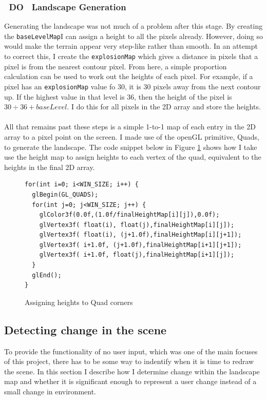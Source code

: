 \documentclass[11pt]{article}
\begin{document}
\subsubsection{~DO~ Landscape Generation}
Generating the landscape was not much of a problem after this stage. By
creating the \texttt{baseLevelMap}I can assign a height to all the pixels
already. However, doing so would make the terrain appear very step-like
rather than smooth. In an attempt to correct this, I create the 
\texttt{explosionMap} which gives a distance in pixels that a pixel 
is from the nearest contour pixel. From here, a simple proportion 
calculation can be used to work out the heights of each pixel. For 
example, if a pixel has an \texttt{explosionMap} value fo 30, it is 30 
pixels away from the next contour up. If the highest value in that
level is 36, then the height of the pixel is
$30 \div 36 + baseLevel$. I do this for all pixels in the 2D array
and store the heights.\\
\\  
All that remains past these steps is a simple 1-to-1 map of each
entry in the 2D array to a pixel point on the screen. I made use of
the openGL primitive, Quads, to generate the landscape. The code snippet
below in Figure \ref{quadcode} shows how I take use the height map 
to assign heights to each vertex of the quad, equivalent to the 
heights in the final 2D array.

\begin{figure}
\begin{lstlisting}
for(int i=0; i<WIN_SIZE; i++) {
  glBegin(GL_QUADS);        
  for(int j=0; j<WIN_SIZE; j++) {
    glColor3f(0.0f,(1.0f/finalHeightMap[i][j]),0.0f);          
    glVertex3f( float(i), float(j),finalHeightMap[i][j]);
    glVertex3f( float(i), (j+1.0f),finalHeightMap[i][j+1]);
    glVertex3f( i+1.0f, (j+1.0f),finalHeightMap[i+1][j+1]);
    glVertex3f( i+1.0f, float(j),finalHeightMap[i+1][j]);
  }
  glEnd();
} 
\end{lstlisting}
\caption{Assigning heights to Quad corners}
\label{quadcode}
\end{figure}

\subsection{Detecting change in the scene}
To provide the functionality of no user input, which was one of the main
focuses of this project, there has to be some way to indentify when it 
is time to redraw the scene. In this section I describe how I determine 
change within the landscape map and whether it is significant enough 
to represent a user change instead of a small change in environment.
\end{document}
